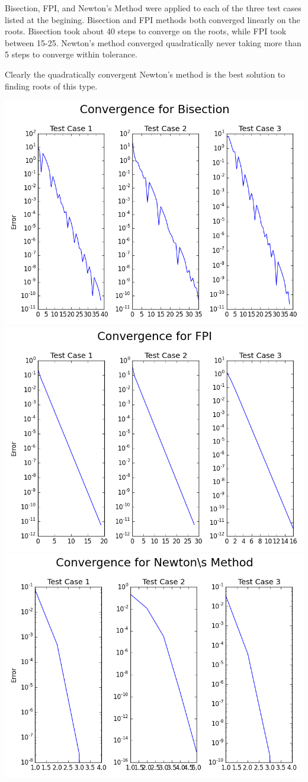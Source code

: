 \documentclass[12pt]{article}
\begin{document}
  Bisection, FPI, and Newton's Method were applied to each of the three test
  cases listed at the begining. Bisection and FPI methods both converged linearly
  on the roots. Bisection took about 40 steps to converge on
  the roots, while FPI took between 15-25. Newton's method converged quadratically
  never taking more than 5 steps to converge within tolerance.

  Clearly the quadratically convergent Newton's method is the best solution
  to finding roots of this type.

  
  \includegraphics[scale=0.65]{bisect_tests.png}\\
  \includegraphics[scale=0.65]{fpi_tests.png}\\
  \includegraphics[scale=0.65]{newton_tests.png}
  
  
\end{document}
